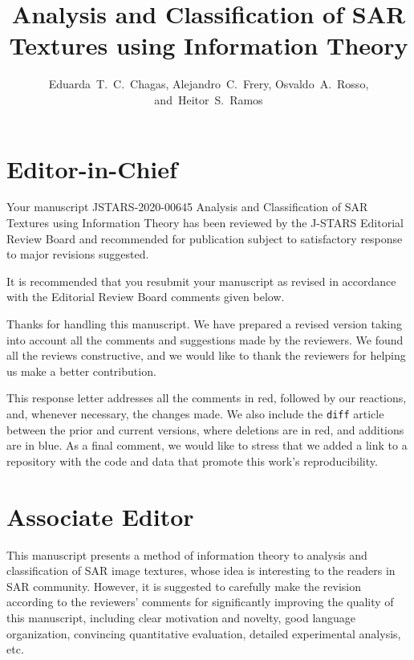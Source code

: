 \documentclass[journal,onecolumn,draftcls,11pt]{IEEEtran}
\begin{document}
\title{Analysis and Classification of SAR Textures using Information Theory}

\author{Eduarda~T.~C.~Chagas,
	Alejandro~C.~Frery,
	Osvaldo~A.~Rosso,
	and~Heitor~S.~Ramos}

\maketitle

\IEEEpeerreviewmaketitle

\section{Editor-in-Chief}
\begin{tcolorbox}[colback=red!5!white,colframe=red!75!black,title=Comment \#1]
Your manuscript JSTARS-2020-00645 Analysis and Classification of SAR Textures using Information Theory has been reviewed by the J-STARS Editorial Review Board and recommended for publication subject to satisfactory response to major revisions suggested. 

It is recommended that you resubmit your manuscript as revised in accordance with the Editorial Review Board comments given below.
\end{tcolorbox}

Thanks for handling this manuscript.
We have prepared a revised version taking into account all the comments and suggestions made by the reviewers.
We found all the reviews constructive, and we would like to thank the reviewers for helping us make a better contribution.

This response letter addresses all the comments in red, followed by
our reactions, and, whenever necessary, the changes made.
We also include the \texttt{diff} article between the prior and current versions, where deletions are in red, and additions are in blue.
As a final comment, we would like to stress that we added a link to a repository with the code and data that promote this work's reproducibility.

\section{Associate Editor}
\begin{tcolorbox}[colback=red!5!white,colframe=red!75!black,title=Comment \#1]
This manuscript presents a method of information theory to analysis and classification of SAR image textures, whose idea is interesting to the readers in SAR community. However, it is suggested to carefully make the revision according to the reviewers’ comments for significantly improving the quality of this manuscript, including clear motivation and novelty, good language organization, convincing quantitative evaluation, detailed experimental analysis, etc.
\end{tcolorbox}
\end{document}
